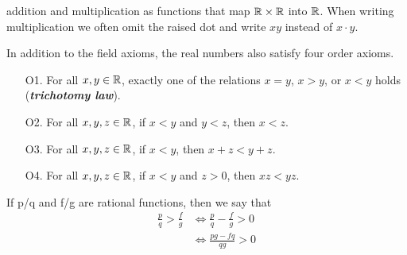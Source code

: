 \documentclass[12pt]{article}
\begin{document}
\begin{axiom}
\begin{remark}
    addition and multiplication as functions that map $\mathbb{R} \times \mathbb{R}$ into
    $\mathbb{R}$. When writing multiplication we often omit the raised dot and write
    $xy$ instead of $x \cdot y$.
  \end{remark}
  In addition to the field axioms, the real numbers also satisfy four order
  axioms.
  \begin{itemize}
  \item [O1. ] For all $x,y \in \mathbb{R}$, exactly one of the relations $x = y$, $x
    > y$, or $x < y$ holds (\textit{\textbf{trichotomy law}}).
  \item [O2. ] For all $x,y,z \in \mathbb{R}$, if $x < y$ and $y < z$, then $x < z$.
  \item [O3. ] For all $x,y,z \in \mathbb{R}$, if $x < y$, then $x + z < y + z$.
  \item [O4. ] For all $x,y,z \in \mathbb{R}$, if $x < y$ and $z > 0$, then $xz <
    yz$.
  \end{itemize}
\end{axiom}

\begin{definition}
  If p/q and f/g are rational functions, then we say that 
  \begin{align*}
    \frac{p}{q} > \frac{f}{g} & \iff \frac{p}{q} - \frac{f}{g} > 0 \\
                              & \iff \frac{pg - fq}{qg} > 0 \\
  \end{align*}
\end{definition}

\end{document}
